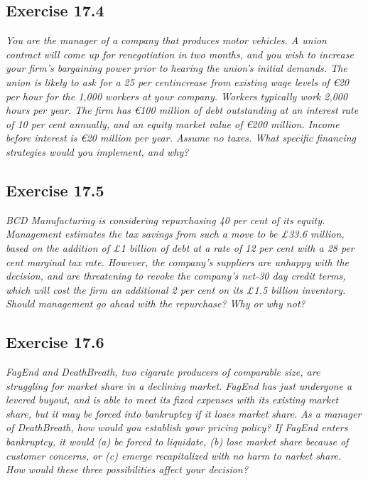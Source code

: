 \documentclass[]{book}
\newcommand{\euro}{€}
\theoremstyle{definition}
\theoremstyle{definition}
\theoremstyle{remark}
\begin{document}
\subsection{Exercise 17.4}\label{exercise-17.4}

\emph{You are the manager of a company that produces motor vehicles. A
union contract will come up for renegotiation in two months, and you
wish to increase your firm's bargaining power prior to hearing the
union's initial demands. The union is likely to ask for a 25 per
centincrease from existing wage levels of \euro{}20 per hour for the
1,000 workers at your company. Workers typically work 2,000 hours per
year. The firm has \euro{}100 million of debt outstanding at an interest
rate of 10 per cent annually, and an equity market value of \euro{}200
million. Income before interest is \euro{}20 million per year. Assume no
taxes. What specific financing strategies would you implement, and why?}
\citep[p.575]{book}

\subsection{Exercise 17.5}\label{exercise-17.5}

\emph{BCD Manufacturing is considering repurchasing 40 per cent of its
equity. Management estimates the tax savings from such a move to be
£33.6 million, based on the addition of £1 billion of debt at a rate of
12 per cent with a 28 per cent marginal tax rate. However, the company's
suppliers are unhappy with the decision, and are threatening to revoke
the company's net-30 day credit terms, which will cost the firm an
additional 2 per cent on its £1.5 billion inventory. Should management
go ahead with the repurchase? Why or why not?} \citep[p.575]{book}

\subsection{Exercise 17.6}\label{exercise-17.6}

\emph{FagEnd and DeathBreath, two cigarate producers of comparable size,
are struggling for market share in a declining market. FagEnd has just
undergone a levered buyout, and is able to meet its fixed expenses with
its existing market share, but it may be forced into bankruptcy if it
loses market share. As a manager of DeathBreath, how would you establish
your pricing policy? If FagEnd enters bankruptcy, it would (a) be forced
to liquidate, (b) lose market share because of customer concerns, or (c)
emerge recapitalized with no harm to narket share. How would these three
possibilities affect your decision?} \citep[p.575-576]{book}
\end{document}
